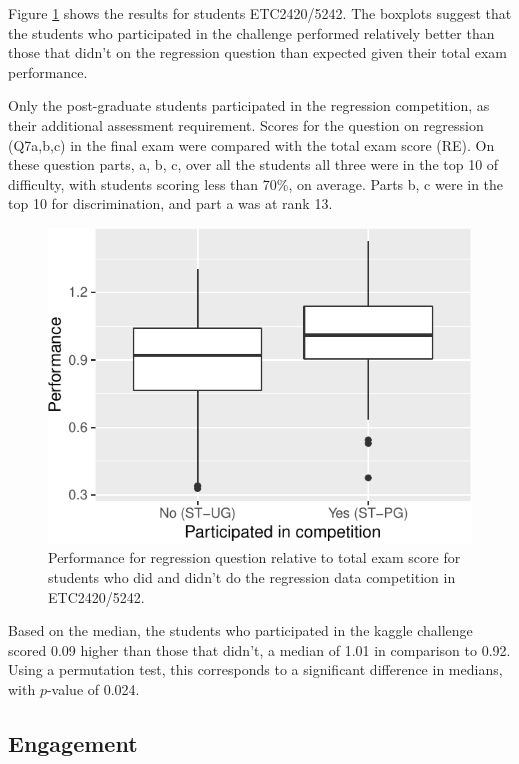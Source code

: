 \documentclass[12pt]{article}
\begin{document}
Figure \ref{fig:ETC5242} shows the results for students ETC2420/5242.
The boxplots suggest that the students who participated in the challenge
performed relatively better than those that didn't on the regression
question than expected given their total exam performance.

Only the post-graduate students participated in the regression
competition, as their additional assessment requirement. Scores for the
question on regression (Q7a,b,c) in the final exam were compared with
the total exam score (RE). On these question parts, a, b, c, over all
the students all three were in the top 10 of difficulty, with students
scoring less than 70\%, on average. Parts b, c were in the top 10 for
discrimination, and part a was at rank 13.

\begin{figure}
\centering
\includegraphics{paper-kaggle_files/figure-latex/ETC5242-1.pdf}
\caption{\label{fig:ETC5242} Performance for regression question
relative to total exam score for students who did and didn't do the
regression data competition in ETC2420/5242.}
\end{figure}

Based on the median, the students who participated in the kaggle
challenge scored 0.09 higher than those that didn't, a median of 1.01 in
comparison to 0.92. Using a permutation test, this corresponds to a
significant difference in medians, with \(p\)-value of 0.024.

\subsection{Engagement}\label{engagement-1}
\end{document}
